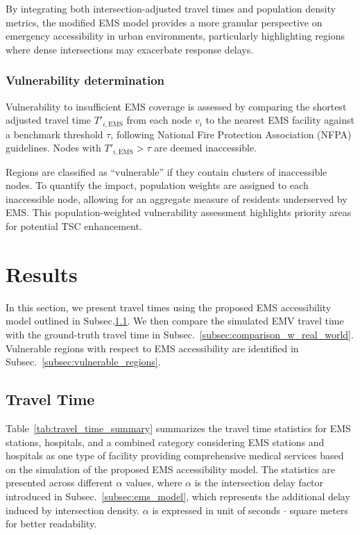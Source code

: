 By integrating both intersection-adjusted travel times and population density metrics, the modified EMS model provides a more granular perspective on emergency accessibility in urban environments, particularly highlighting regions where dense intersections may exacerbate response delays.

\subsubsection{Vulnerability determination}
Vulnerability to insufficient EMS coverage is assessed by comparing the shortest adjusted travel time \( T'_{i,\text{EMS}} \) from each node \( v_i \) to the nearest EMS facility against a benchmark threshold \( \tau \), following National Fire Protection Association (NFPA) guidelines\cite{NFPA1710}. Nodes with \( T'_{i,\text{EMS}} > \tau \) are deemed inaccessible.

Regions are classified as “vulnerable” if they contain clusters of inaccessible nodes. To quantify the impact, population weights are assigned to each inaccessible node, allowing for an aggregate measure of residents underserved by EMS. This population-weighted vulnerability assessment highlights priority areas for potential TSC enhancement.

\section{Results}\label{sec:results}
In this section, we present travel times using the proposed EMS accessibility model outlined in Subsec.\ref{subsec:travel_time}. We then compare the simulated EMV travel time with the ground-truth travel time in Subsec.~\ref{subsec:comparison_w_real_world}. Vulnerable regions with respect to EMS accessibility are identified in Subsec.~\ref{subsec:vulnerable_regions}. 
\subsection{Travel Time}\label{subsec:travel_time}

Table~\ref{tab:travel_time_summary} summarizes the travel time statistics for EMS stations, hospitals, and a combined category considering EMS stations and hospitals as one type of facility providing comprehensive medical services based on the simulation of the proposed EMS accessibility model. The statistics are presented across different \(\alpha\) values, where \(\alpha\) is the intersection delay factor introduced in Subsec.~\ref{subsec:ems_model}, which represents the additional delay induced by intersection density. \(\alpha\) is expressed in unit of seconds $\cdot$ square meters for better readability.

